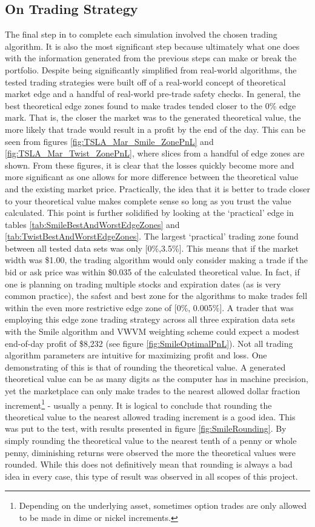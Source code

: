 \documentclass[12pt, a4paper, notitlepage]{article}
\numberwithin{equation}{subsection}
\numberwithin{figure}{subsection}
\numberwithin{table}{subsection}
\newcommand{\newpar}{\newline \newline}
\begin{document}
\subsection{On Trading Strategy}
The final step in to complete each simulation involved the chosen trading algorithm.  It is also the most significant step because ultimately what one does with the information generated from the previous steps can make or break the portfolio.  Despite being significantly simplified from real-world algorithms, the tested trading strategies were built off of a real-world concept of theoretical market edge and a handful of real-world pre-trade safety checks.
\newpar
In general, the best theoretical edge zones found to make trades tended closer to the 0\% edge mark.  That is, the closer the market was to the generated theoretical value, the more likely that trade would result in a profit by the end of the day.  This can be seen from figures \ref{fig:TSLA_Mar_Smile_ZonePnL} and \ref{fig:TSLA_Mar_Twist_ZonePnL}, where slices from a handful of edge zones are shown.  From these figures, it is clear that the losses quickly become more and more significant as one allows for more difference between the theoretical value and the existing market price.
\newpar
Practically, the idea that it is better to trade closer to your theoretical value makes complete sense so long as you trust the value calculated.  This point is further solidified by looking at the `practical' edge in tables \ref{tab:SmileBestAndWorstEdgeZones} and \ref{tab:TwistBestAndWorstEdgeZones}.  The largest `practical' trading zone found between all tested data sets was only [0\%,3.5\%].  This means that if the market width was \$1.00, the trading algorithm would only consider making a trade if the bid or ask price was within \$0.035 of the calculated theoretical value.  In fact, if one is planning on trading multiple stocks and expiration dates (as is very common practice), the safest and best zone for the algorithms to make trades fell within the even more restrictive edge zone of [0\%, 0.005\%].  A trader that was employing this edge zone trading strategy across all three expiration data sets with the Smile algorithm and VWVM weighting scheme could expect a modest end-of-day profit of \$8,232 (see figure \ref{fig:SmileOptimalPnL}).
\newpar
Not all trading algorithm parameters are intuitive for maximizing profit and loss.  One demonstrating of this is that of rounding the theoretical value.  A generated theoretical value can be as many digits as the computer has in machine precision, yet the marketplace can only make trades to the nearest allowed dollar fraction increment\footnote{Depending on the underlying asset, sometimes option trades are only allowed to be made in dime or nickel increments.} - usually a penny.  It is logical to conclude that rounding the theoretical value to the nearest allowed trading increment is a good idea.  This was put to the test, with results presented in figure \ref{fig:SmileRounding}.  By simply rounding the theoretical value to the nearest tenth of a penny or whole penny, diminishing returns were observed the more the theoretical values were rounded.  While this does not definitively mean that rounding is always a bad idea in every case, this type of result was observed in all scopes of this project.
\end{document}
